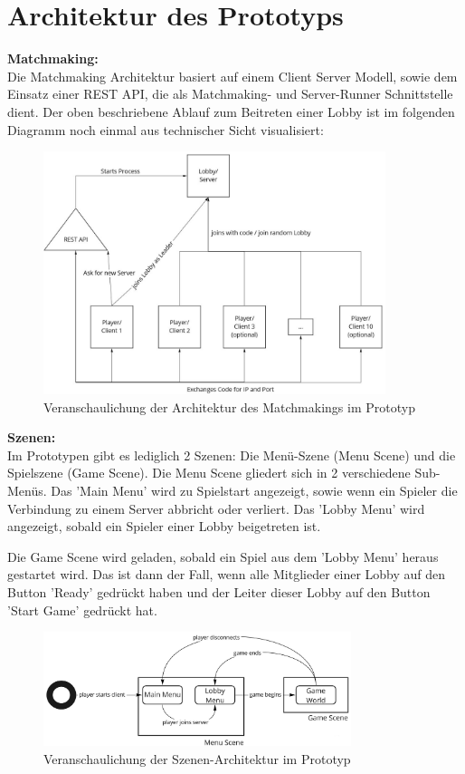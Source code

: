 \section{Architektur des Prototyps}
\label{Architektur}

\textbf{Matchmaking:} \\
Die Matchmaking Architektur basiert auf einem Client Server Modell, sowie dem Einsatz einer REST API, die als Matchmaking- und Server-Runner Schnittstelle dient. Der oben beschriebene Ablauf zum Beitreten einer Lobby ist im folgenden Diagramm noch einmal aus technischer Sicht visualisiert:

\begin{figure}[H]
	\centering
	\includegraphics[width=100mm]{images/prototype_architecture_matchmaking.jpg}
	\caption[Architektur Matchmaking Diagramm]{Veranschaulichung der Architektur des Matchmakings im Prototyp}
	\label{pic:prototype_architecture_matchmaking}
\end{figure}

\textbf{Szenen:} \\
Im Prototypen gibt es lediglich 2 Szenen: Die Menü-Szene (Menu Scene) und die Spielszene (Game Scene).
Die Menu Scene gliedert sich in 2 verschiedene Sub-Menüs. Das 'Main Menu' wird zu Spielstart angezeigt, sowie wenn ein Spieler die Verbindung zu einem Server abbricht oder verliert. Das 'Lobby Menu' wird angezeigt, sobald ein Spieler einer Lobby beigetreten ist. 

Die Game Scene wird geladen, sobald ein Spiel aus dem 'Lobby Menu' heraus gestartet wird. Das ist dann der Fall, wenn alle Mitglieder einer Lobby auf den Button 'Ready' gedrückt haben und der Leiter dieser Lobby auf den Button 'Start Game' gedrückt hat. 

\begin{figure}[H]
	\centering
	\includegraphics[width=90mm]{images/scene_architecture.jpg}
	\caption[Architektur Szenen Diagramm]{Veranschaulichung der Szenen-Architektur im Prototyp}
	\label{pic:scene_architecture}
\end{figure}

